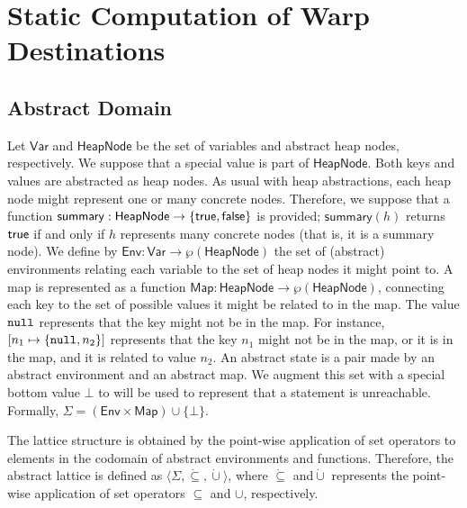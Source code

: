 \newcommand{\set}[1]{\mathsf{#1}}
\newcommand{\isSummary}{\set{summary}}
\newcommand{\freshNode}{\set{fresh}}
\newcommand{\heapnode}{\set{HeapNode}}
\newcommand{\variable}{\set{Var}}
\newcommand{\env}{\set{Env}}
\newcommand{\map}{\set{Map}}
\newcommand{\state}{\set{\Sigma}}

\section{Static Computation of Warp Destinations}

\subsection{Abstract Domain}
\label{sect:abstractate}

Let $\variable$ and $\heapnode$ be the set of variables and abstract heap nodes, respectively. We suppose that a special  value is part of $\heapnode$. Both keys and values are abstracted as heap nodes. As usual with heap abstractions, each heap node might represent one or many concrete nodes. Therefore, we suppose that a function $\isSummary : \heapnode \to \{\true, \false\}$ is provided; $\isSummary(h)$ returns $\mathsf{true}$ if and only if $h$ represents many concrete nodes (that is, it is a summary node). We define by $\env : \variable \to \wp(\heapnode)$ the set of (abstract) environments relating each variable to the set of heap nodes it might point to. A map is represented as a function $\map : \heapnode \to \wp(\heapnode)$, connecting each key to the set of possible values it might be related to in the map. The value $\mathtt{null}$ represents that the key might not be in the map. For instance, $[n_1 \mapsto \{\mathtt{null}, n_2\}]$ represents that the key $n_1$ might not be in the map, or it is in the map, and it is related to value $n_2$. An abstract state is a pair made by an abstract environment and an abstract map. We augment this set with a special bottom value $\bot$ to will be used to represent that a statement is unreachable. Formally, $\state = (\env \times \map) \cup \{\bot\}$.

The lattice structure is obtained by the point-wise application of set operators to elements in the codomain of abstract environments and functions. Therefore, the abstract lattice is defined as $\langle \state, \dot{\subseteq}, \dot{\cup} \rangle$, where $\dot{\subseteq}$ and$\dot{\cup}$ represents the point-wise application of set operators $\subseteq$ and $\cup$, respectively.

